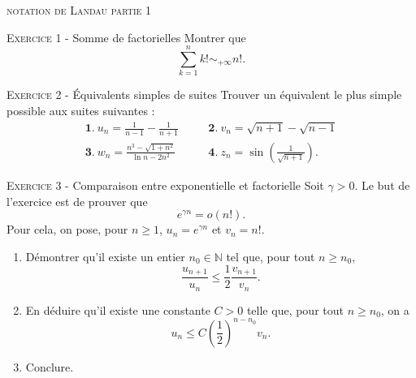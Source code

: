 \documentclass[11pt]{article}
\begin{document}
 

\begin{center}\textsc{{\huge notation de Landau partie 1}}\end{center}



\vskip0.3cm\noindent\textsc{Exercice 1} - Somme de factorielles
\vskip0.2cm
Montrer que 
$$\sum_{k=1}^n k!\sim_{+\infty} n!.$$




\vskip0.3cm\noindent\textsc{Exercice 2} - \'Equivalents simples de suites
\vskip0.2cm
Trouver un équivalent le plus simple possible aux suites suivantes :
$$\begin{array}{lll}
\mathbf 1.\ u_n=\frac{1}{n-1}-\frac{1}{n+1}&\quad&\mathbf 2.\ v_n=\sqrt{n+1}-\sqrt{n-1}\\
\mathbf 3.\ w_n=\frac{n^3-\sqrt{1+n^2}}{\ln n-2n^2}&\quad&\mathbf 4.\ z_n=\sin\left(\frac1{\sqrt{n+1}}\right).
\end{array}$$




\vskip0.3cm\noindent\textsc{Exercice 3} - Comparaison entre exponentielle et factorielle
\vskip0.2cm
Soit $\gamma>0$. Le but de l'exercice est de prouver que 
$$e^{\gamma n}=o(n!).$$
Pour cela, on pose, pour $n\geq 1$, $u_n=e^{\gamma n}$ et $v_n=n!$. 
\begin{enumerate}
\item Démontrer qu'il existe un entier $n_0\in\mathbb N$ tel que, pour tout $n\geq n_0$, 
$$\frac{u_{n+1}}{u_n}\leq\frac 12\frac{v_{n+1}}{v_n}.$$
\item En déduire qu'il existe une constante $C>0$ telle que, pour tout $n\geq n_0$, on a
$$u_n\leq C\left(\frac 12\right)^{n-n_0}v_n.$$
\item Conclure.
\end{enumerate}




\vskip0.5cm

\end{document}

